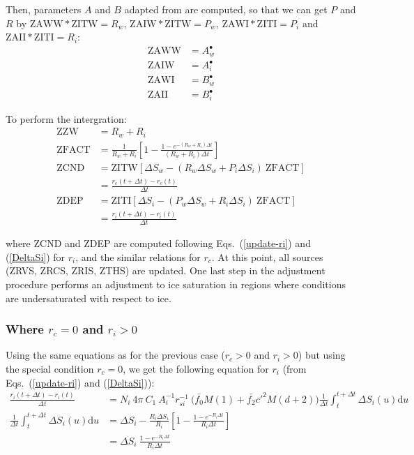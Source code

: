 { Then, parameters $A$ and $B$ adapted from \citet{Reisin1996} are computed, so that we can get $P$ and $R$ by $\mathrm{ZAWW} * \mathrm{ZITW} = R_w$, $\mathrm{ZAIW} * \mathrm{ZITW} = P_w$, $\mathrm{ZAWI} * \mathrm{ZITI} = P_i$ and $\mathrm{ZAII} * \mathrm{ZITI} = R_i$:
 \begin{align}
 \mathrm{ZAWW} &= A_w^\bullet \\
 \mathrm{ZAIW} &= A_i^\bullet \\
 \mathrm{ZAWI} &= B_w^\bullet \\
 \mathrm{ZAII} &= B_i^\bullet 
 \end{align}
 
 To perform the intergration:
 \begin{align}
 \mathrm{ZZW} &= R_w + R_i \\
 \mathrm{ZFACT} &= \frac{1}{R_w + R_i} \left[ 1 - \frac{1 - e^{-(R_w + R_i)\Delta t}}{(R_w + R_i)\Delta t} \right] \\
 \mathrm{ZCND} &= \mathrm{ZITW} [\Delta S_w - (R_w \Delta S_w + P_i \Delta S_i) ~ \mathrm{ZFACT}] \\
 &= \frac{r_c(t + \Delta t) - r_c(t)}{\Delta t} \\
 \mathrm{ZDEP} &= \mathrm{ZITI} [\Delta S_i - (P_w \Delta S_w + R_i \Delta S_i) ~ \mathrm{ZFACT}] \\
 &= \frac{r_i(t + \Delta t) - r_i(t)}{\Delta t}
\end{align}

where ZCND and ZDEP are computed following Eqs.\ (\ref{update-ri}) and (\ref{DeltaSi}) for $r_i$, and the similar relations for $r_c$. At this point, all sources (ZRVS, ZRCS, ZRIS, ZTHS) are updated. One last step in the adjustment procedure performs an adjustment to ice saturation in regions where conditions are undersaturated with respect to ice.
\endgroup
 
\subsubsection{Where $r_c=0$ and $r_i>0$}

Using the same equations as for the previous case ($r_c>0$ and $r_i>0$) but using the special condition $r_c=0$, we get the following equation for $r_i$ (from Eqs.\ (\ref{update-ri}) and (\ref{DeltaSi})):
\begin{align}
 \frac{r_i(t + \Delta t) - r_i(t)}{\Delta t} &= N_i ~ 4\pi ~ C_1 ~ A_i^{-1} r_{si}^{-1} ~ \Bigg( \bar{f_0} M(1) + \bar{f_2} c'^2 M(d+2) \Bigg) \frac{1}{\Delta t} \int_t^{t + \Delta t} \Delta S_i(u) \mathrm{d}u \\
 \frac{1}{\Delta t} \int_t^{t + \Delta t} \Delta S_i(u) \mathrm{d}u &= \Delta S_i - \frac{R_i \Delta S_i}{R_i} \left[ 1 - \frac{1 - e^{-R_i\Delta t}}{R_i\Delta t} \right] \\
 &= \Delta S_i ~ \frac{1 - e^{-R_i\Delta t}}{R_i\Delta t}
\end{align}

}
